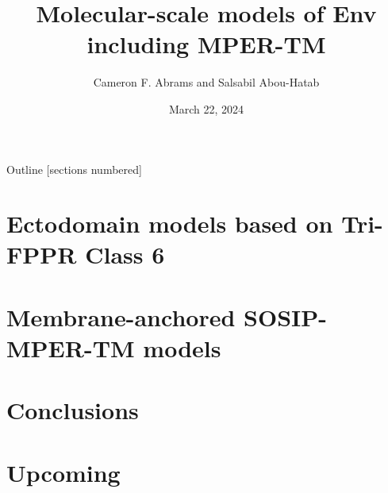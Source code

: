 \documentclass[10pt]{beamer}
\title{Molecular-scale models of Env including MPER-TM}
\date{March 22, 2024}
\author{Cameron F. Abrams and Salsabil Abou-Hatab}
\institute{Drexel University, Department of Chemical and Biological Engineering}
\begin{document}
\maketitle
\begin{frame}{Outline}
  [sections numbered]
  \tableofcontents[hideallsubsections]
\end{frame}

\section{Ectodomain models based on Tri-FPPR Class 6}










\section{Membrane-anchored SOSIP-MPER-TM models}



\section{Conclusions}


\section{Upcoming}





% 
\end{document}
